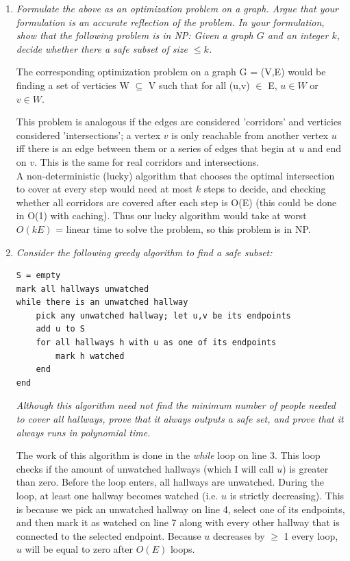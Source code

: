 \documentclass[12pt]{article} \setlength{\oddsidemargin}{0in}
\begin{document}
\begin{enumerate}
\item\textit{Formulate the above as an optimization problem on a graph. Argue that your formulation is an accurate reflection of the problem. In your formulation, show that the following problem is in NP: Given a graph $G$ and an integer $k$, decide whether there a safe subset of size $\leq k$.}

The corresponding optimization problem on a graph G = (V,E) would be finding a set of verticies W $\subseteq$ V such that for all (u,v) $\in$ E, $u \in W$ or $v \in W$. 

This problem is analogous if the edges are considered 'corridors' and verticies considered 'intersections'; a vertex $v$ is only reachable from another vertex $u$ iff there is an edge between them or a series of edges that begin at $u$ and end on $v$. This is the same for real corridors and intersections. \\

A non-deterministic (lucky) algorithm that chooses the optimal intersection to cover at every step would need at most $k$ steps to decide, and checking whether all corridors are covered after each step is O(E) (this could be done in O(1) with caching). Thus our lucky algorithm would take at worst $O(kE)$ = linear time to solve the problem, so this problem is in NP. 


\item\textit{Consider the following greedy algorithm to find a safe subset:}
\begin{verbatim}
S = empty
mark all hallways unwatched
while there is an unwatched hallway
    pick any unwatched hallway; let u,v be its endpoints
    add u to S
    for all hallways h with u as one of its endpoints
        mark h watched
    end
end
\end{verbatim}
\textit{Although this algorithm need not find the minimum number of people needed to cover all hallways, prove that it always outputs a safe set, and prove that it always runs in polynomial time.}\label{s:SafeProof}

The work of this algorithm is done in the \textit{while} loop on line 3. This loop checks if the amount of unwatched hallways (which I will call $u$) is greater than zero. Before the loop enters, all hallways are unwatched. During the loop, at least one hallway becomes watched (i.e. $u$ is strictly decreasing). This is because we pick an unwatched hallway on line 4, select one of its endpoints, and then mark it as watched on line 7 along with every other hallway that is connected to the selected endpoint. Because $u$ decreases by $\ge$ 1 every loop, $u$ will be equal to zero after $O(E)$ loops.


\end{enumerate}
\end{document}

